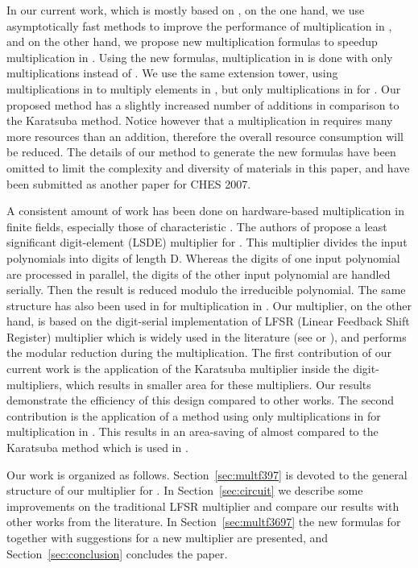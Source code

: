 \documentclass{article}
\begin{document}
In our current work, which is mostly based on \cite{kermar05}, on the
one hand, we use asymptotically fast methods to improve the
performance of multiplication in , and on the other hand,
we propose new multiplication formulas to speedup multiplication in
.
Using the new formulas, multiplication in  is
done with only  multiplications instead of . 
We use the same extension tower, using  multiplications in
 to multiply elements in , but only
 multiplications in  for .
Our proposed method has a slightly increased number of
additions in comparison to the Karatsuba method. Notice however that a
multiplication in  requires many more resources than an
addition, therefore the overall resource consumption will be reduced.
The details of our method to generate the new formulas have been
omitted to limit the complexity and diversity of materials in this
paper, and have been submitted as another paper for CHES 2007.

A consistent amount of work has been done on hardware-based
multiplication in finite fields, especially those of characteristic
. The authors of \cite{bergua03} propose a least significant
digit-element (LSDE) multiplier for . 
This multiplier divides the input polynomials into digits of length D. Whereas the digits of one input polynomial are processed in parallel, the digits of the other input polynomial are handled serially. Then the result is reduced modulo the
irreducible polynomial. 
The same structure has also been used in \cite{kermar05} for
multiplication in . 
Our multiplier, on the other hand, is based on the digit-serial
implementation of LFSR (Linear Feedback Shift Register) multiplier
which is widely used in the literature (see \cite{mce87} or
\cite{sho06}), and performs the modular reduction during the multiplication. The first contribution of our current work is
the application of the Karatsuba multiplier inside the
digit-multipliers, which results in smaller area for these
multipliers. 
Our results demonstrate the efficiency of this design compared to other works. 
The second contribution is the application of a method using only 
multiplications in  for multiplication in
. This results in an area-saving of almost
 compared to the Karatsuba method which is used in
\cite{kermar05}.
   
Our work is organized as follows. Section~\ref{sec:multf397} is
devoted to the general structure of our multiplier for . In
Section~\ref{sec:circuit} we describe some improvements on the
traditional LFSR multiplier and compare our results with other works
from the literature. 
In Section~\ref{sec:multf3697} the new formulas for  together with suggestions for a new multiplier are
presented, and Section~\ref{sec:conclusion} concludes the paper.
\end{document}
